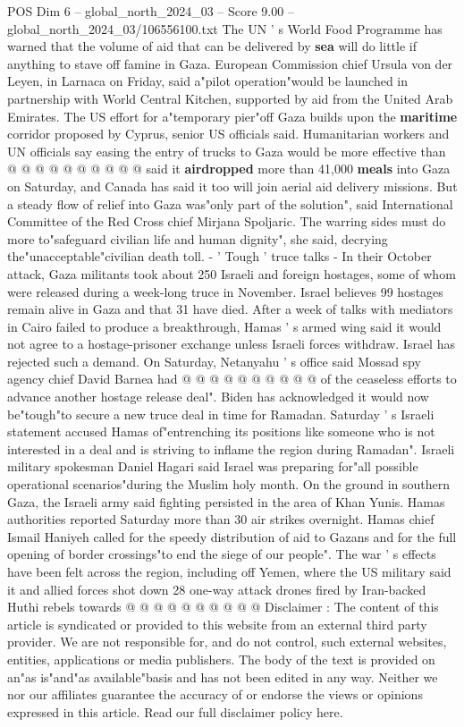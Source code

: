 \begin{textsample}{POS Dim 6 – global\_north\_2024\_03 – Score 9.00 – global\_north\_2024\_03/106556100.txt}
The UN ' s World Food Programme has warned that the volume of aid that can be delivered by \textbf{sea} will do little if anything to stave off famine in Gaza.
European Commission chief Ursula von der Leyen, in Larnaca on Friday, said a"pilot operation"would be launched in partnership with World Central Kitchen, supported by aid from the United Arab Emirates.
The US effort for a"temporary pier"off Gaza builds upon the \textbf{maritime} corridor proposed by Cyprus, senior US officials said.
Humanitarian workers and UN officials say easing the entry of trucks to Gaza would be more effective than @ @ @ @ @ @ @ @ @ @ said it \textbf{airdropped} more than 41,000 \textbf{meals} into Gaza on Saturday, and Canada has said it too will join aerial aid delivery missions.
But a steady flow of relief into Gaza was"only part of the solution", said International Committee of the Red Cross chief Mirjana Spoljaric.
The warring sides must do more to"safeguard civilian life and human dignity", she said, decrying the"unacceptable"civilian death toll. - ' Tough ' truce talks - In their October attack, Gaza militants took about 250 Israeli and foreign hostages, some of whom were released during a week-long truce in November.
Israel believes 99 hostages remain alive in Gaza and that 31 have died.
After a week of talks with mediators in Cairo failed to produce a breakthrough, Hamas ' s armed wing said it would not agree to a hostage-prisoner exchange unless Israeli forces withdraw.
Israel has rejected such a demand.
On Saturday, Netanyahu ' s office said Mossad spy agency chief David Barnea had @ @ @ @ @ @ @ @ @ @ of the ceaseless efforts to advance another hostage release deal".
Biden has acknowledged it would now be"tough"to secure a new truce deal in time for Ramadan.
Saturday ' s Israeli statement accused Hamas of"entrenching its positions like someone who is not interested in a deal and is striving to inflame the region during Ramadan".
Israeli military spokesman Daniel Hagari said Israel was preparing for"all possible operational scenarios"during the Muslim holy month.
On the ground in southern Gaza, the Israeli army said fighting persisted in the area of Khan Yunis.
Hamas authorities reported Saturday more than 30 air strikes overnight.
Hamas chief Ismail Haniyeh called for the speedy distribution of aid to Gazans and for the full opening of border crossings"to end the siege of our people".
The war ' s effects have been felt across the region, including off Yemen, where the US military said it and allied forces shot down 28 one-way attack drones fired by Iran-backed Huthi rebels towards @ @ @ @ @ @ @ @ @ @ Disclaimer : The content of this article is syndicated or provided to this website from an external third party provider.
We are not responsible for, and do not control, such external websites, entities, applications or media publishers.
The body of the text is provided on an"as is"and"as available"basis and has not been edited in any way.
Neither we nor our affiliates guarantee the accuracy of or endorse the views or opinions expressed in this article.
Read our full disclaimer policy here.

\end{textsample}

